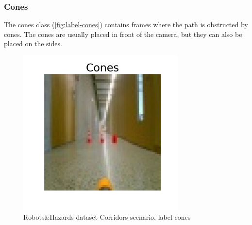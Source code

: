         \subsubsection*{Cones}
            The cones class (\autoref{fig:label-cones}) contains frames where the path is obstructed by cones. The cones are usually placed in front of the camera, but they can also be placed on the sides.
            \begin{figure}[H]
                \centering
                \centerline{\includegraphics[width=0.75\textwidth]{img/labels/cones.png}}
                \caption{Robots\&Hazards dataset Corridors scenario, label cones}
                \label{fig:label-cones}
            \end{figure}

